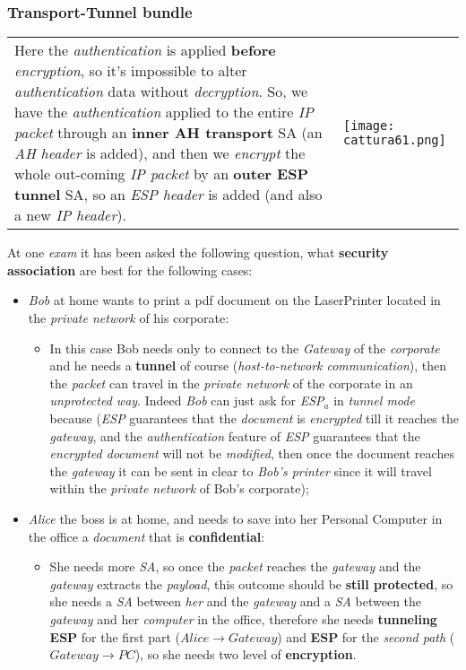 \documentclass{article}
\begin{document}
\subsubsection{Transport-Tunnel bundle}
\begin{tabular}{C{9.5cm}  L{10.5cm}}
Here the \emph{authentication} is applied \textbf{before} \emph{encryption}, so it's impossible to alter \emph{authentication} data without \emph{decryption}. So, we have the \emph{authentication} applied to the entire \emph{IP packet} through an \textbf{inner AH transport} SA (an \emph{AH header} is added), and then we \emph{encrypt} the whole out-coming \emph{IP packet} by an \textbf{outer ESP tunnel} SA, so an \emph{ESP header} is added (and also a new \emph{IP header}). 
& \texttt{[image: cattura61.png]}
\end{tabular} 
At one \emph{exam} it has been asked the following question, what \textbf{security association} are best for the following cases:
\begin{itemize}
\item \emph{Bob} at home wants to print a pdf document on the LaserPrinter located in the \emph{private network} of his corporate:
\begin{itemize}
\item In this case Bob needs only to connect to the \emph{Gateway} of the \emph{corporate} and he needs a \textbf{tunnel} of course (\emph{host-to-network communication}), then the \emph{packet} can travel in the \emph{private network} of the corporate in an \emph{unprotected way}. Indeed \emph{Bob} can just ask for \emph{ESP}$_a$ in \emph{tunnel mode} because (\emph{ESP} guarantees that the \emph{document} is \emph{encrypted} till it reaches the \emph{gateway}, and the \emph{authentication} feature of \emph{ESP} guarantees that the \emph{encrypted document} will not be \emph{modified}, then once the document reaches the \emph{gateway} it can be sent in clear to \emph{Bob’s printer} since it will travel within the \emph{private network} of Bob’s corporate);
\end{itemize}
\item \emph{Alice} the boss is at home, and needs to save into her Personal Computer in the office a \emph{document} that is \textbf{confidential}:
\begin{itemize}
\item She needs more \emph{SA}, so once the \emph{packet} reaches the \emph{gateway} and the \emph{gateway} extracts the \emph{payload}, this outcome should be \textbf{still protected}, so she needs a \emph{SA} between \emph{her} and the \emph{gateway} and a \emph{SA} between the \emph{gateway} and her \emph{computer} in the office, therefore she needs \textbf{tunneling ESP} for the first part ($Alice \rightarrow Gateway$) and \textbf{ESP} for the \emph{second path} ($Gateway \rightarrow PC$), so she needs two level of \textbf{encryption}.
\end{itemize}
\end{itemize}
\end{document}
